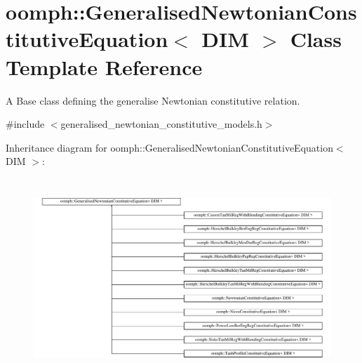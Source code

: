 \hypertarget{classoomph_1_1GeneralisedNewtonianConstitutiveEquation}{}\section{oomph\+:\+:Generalised\+Newtonian\+Constitutive\+Equation$<$ D\+IM $>$ Class Template Reference}
\label{classoomph_1_1GeneralisedNewtonianConstitutiveEquation}


A Base class defining the generalise Newtonian constitutive relation.  




{\ttfamily \#include $<$generalised\+\_\+newtonian\+\_\+constitutive\+\_\+models.\+h$>$}

Inheritance diagram for oomph\+:\+:Generalised\+Newtonian\+Constitutive\+Equation$<$ D\+IM $>$\+:\begin{figure}[H]
\begin{center}
\leavevmode
\includegraphics[height=7.500000cm]{classoomph_1_1GeneralisedNewtonianConstitutiveEquation}
\end{center}
\end{figure}
